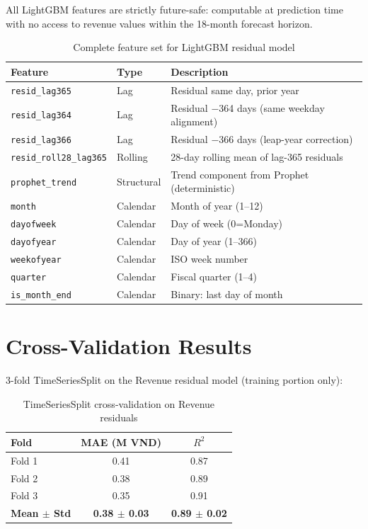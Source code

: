 \documentclass{article}
\begin{document}
All LightGBM features are strictly future-safe: computable at prediction time with no access to revenue values within the 18-month forecast horizon.

\begin{table}[h]
  \caption{Complete feature set for LightGBM residual model}
  \label{tab:features}
  \centering
  \small
  \begin{tabular}{llp{5cm}}
    \toprule
    \textbf{Feature} & \textbf{Type} & \textbf{Description} \\
    \midrule
    \texttt{resid\_lag365} & Lag & Residual same day, prior year \\
    \texttt{resid\_lag364} & Lag & Residual $-$364 days (same weekday alignment) \\
    \texttt{resid\_lag366} & Lag & Residual $-$366 days (leap-year correction) \\
    \texttt{resid\_roll28\_lag365} & Rolling & 28-day rolling mean of lag-365 residuals \\
    \texttt{prophet\_trend} & Structural & Trend component from Prophet (deterministic) \\
    \texttt{month} & Calendar & Month of year (1--12) \\
    \texttt{dayofweek} & Calendar & Day of week (0=Monday) \\
    \texttt{dayofyear} & Calendar & Day of year (1--366) \\
    \texttt{weekofyear} & Calendar & ISO week number \\
    \texttt{quarter} & Calendar & Fiscal quarter (1--4) \\
    \texttt{is\_month\_end} & Calendar & Binary: last day of month \\
    \bottomrule
  \end{tabular}
\end{table}

\section{Cross-Validation Results}

3-fold TimeSeriesSplit on the Revenue residual model (training portion only):

\begin{table}[h]
  \caption{TimeSeriesSplit cross-validation on Revenue residuals}
  \centering
  \small
  \begin{tabular}{lcc}
    \toprule
    \textbf{Fold} & \textbf{MAE (M VND)} & \textbf{$R^2$} \\
    \midrule
    Fold 1 & 0.41 & 0.87 \\
    Fold 2 & 0.38 & 0.89 \\
    Fold 3 & 0.35 & 0.91 \\
    \midrule
    \textbf{Mean $\pm$ Std} & \textbf{0.38 $\pm$ 0.03} & \textbf{0.89 $\pm$ 0.02} \\
    \bottomrule
  \end{tabular}
\end{table}
\end{document}
